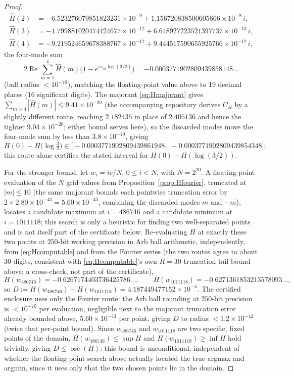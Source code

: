 \documentclass[11pt]{article}
\theoremstyle{definition}
\theoremstyle{remark}
\begin{document}
\begin{proof}
\begin{align*}
\hat H(2) &= -6.523276079851823231\times10^{-9} + 1.156720838500605666\times10^{-8}\,i,\\
\hat H(3) &= -1.799881020474424677\times10^{-12} + 6.648927223521397737\times10^{-13}\,i,\\
\hat H(4) &= -9.219524659678388767\times10^{-17} + 9.444517590655925766\times10^{-17}\,i,
\end{align*}
the four-mode sum
\[
2\operatorname{Re}\sum_{m=1}^4\hat H(m)\bigl(1-e^{i\omega_m\log(3/2)}\bigr)
= -0.0003771902809439858148\ldots
\]
(ball radius $<10^{-70}$), matching the floating-point value above to $19$ decimal places ($16$
significant digits). The majorant
\eqref{eq:Hmajorant} gives
$\sum_{m>4}|\hat H(m)| \le 9.41\times10^{-20}$ (the accompanying
repository derives $C_H$ by a slightly different route, reaching
$2.182435$ in place of $2.405136$ and hence the tighter
$9.04\times10^{-20}$; either bound serves here), so the discarded modes move the four-mode sum by
less than $3.8\times10^{-19}$, giving
\[
H(0)-H\bigl(\log\tfrac32\bigr) \in \bigl[-0.0003771902809439861948,\; -0.0003771902809439854348\bigr];
\]
this route alone certifies the stated interval for $H(0)-H(\log(3/2))$.

For the stronger bound, let $w_i = ic/N$, $0\le i<N$, with $N = 2^{20}$. A floating-point evaluation
of the $N$ grid values from Proposition~\ref{prop:Hfourier}, truncated at $|m|\le10$ (the same
majorant bounds each pointwise truncation error by $2\times2.80\times10^{-43}=5.60\times10^{-43}$,
combining the discarded modes $m$ and $-m$), locates a candidate maximum at
$i=486746$ and a candidate minimum at $i=1011118$; this search is only a heuristic for finding
two well-separated points and is not itself part of the certificate below. Re-evaluating $H$ at
exactly these two points at $250$-bit working precision in Arb ball arithmetic, independently, from
\eqref{eq:Hcomputable} and from the Fourier series (the two routes agree to about $30$ digits,
consistent with \eqref{eq:Hcomputable}'s own $R=30$ truncation tail bound above; a cross-check, not
part of the certificate),
\[
H(w_{486746}) = -0.6267174403736425786\ldots, \qquad H(w_{1011118}) = -0.6271361853213578093\ldots,
\]
so $D := H(w_{486746})-H(w_{1011118}) = 4.187449477152\times10^{-4}$. The certified enclosure uses
only the Fourier route: the Arb ball rounding at $250$-bit precision is $<10^{-70}$ per evaluation,
negligible next to the majorant truncation error already bounded above, $5.60\times10^{-43}$ per
point, giving $D$ to radius $<1.2\times10^{-42}$ (twice that per-point bound). Since $w_{486746}$ and
$w_{1011118}$ are two specific, fixed points of the domain, $H(w_{486746})\le\sup H$ and
$H(w_{1011118})\ge\inf H$ hold trivially, giving $D\le\operatorname{osc}(H)$: this bound is
unconditional, independent of whether the floating-point search above actually located the true
argmax and argmin, since it uses only that the two chosen points lie in the domain.


\end{proof}
\end{document}

